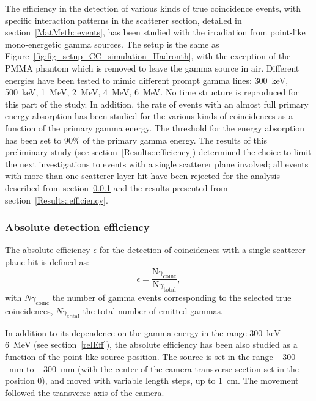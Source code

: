 The efficiency in the detection of various kinds of true coincidence events, with specific interaction patterns in the scatterer section, detailed in section~\ref{MatMeth::events}, has been studied with the irradiation from point-like mono-energetic gamma sources. The setup is the same as Figure~\ref{fig:fig_setup_CC_simulation_Hadronth}, with the exception of the PMMA phantom which is removed to leave the gamma source in air. Different energies have been tested to mimic different prompt gamma lines: 300~keV, 500~keV, 1~MeV, 2~MeV, 4~MeV, 6~MeV. No time structure is reproduced for this part of the study.
In addition, the rate of events with an almost full primary energy absorption has been studied for the various kinds of coincidences as a function of the primary gamma energy. The threshold for the energy absorption has been set to 90\% of the primary gamma energy. 
The results of this preliminary study (see section~\ref{Results::efficiency}) determined the choice to limit the next investigations to events with a single scatterer plane involved; all events with more than one scatterer layer hit have been rejected for the analysis described from section~\ref{absEff} and the results presented from section~\ref{Results::efficiency}.

\subsubsection{Absolute detection efficiency}\label{absEff}

The absolute efficiency $\epsilon$ for the detection of coincidences with a single scatterer plane hit is defined as:
\begin{equation}
\epsilon =\frac{\mathrm{N}\gamma_{\mathrm{coinc}}}{\mathrm{N}\gamma_{\mathrm{total}}},
\end{equation}
\label{eq:equation_efficacite_absolue}
with $N\gamma_{\mathrm{coinc}}$ the number of gamma events corresponding to the selected true coincidences, $N\gamma_{\mathrm{total}}$ the total number of emitted gammas.

In addition to its dependence on the gamma energy in the range 300~keV -- 6~MeV (see section~\ref{relEff}), the absolute efficiency has been also studied as a function of the point-like source position. The source is set in the range $-300$~mm to $+300$~mm (with the center of the camera transverse section set in the position 0), and moved with variable length steps, up to 1~cm. The movement followed the transverse axis of the camera. 

